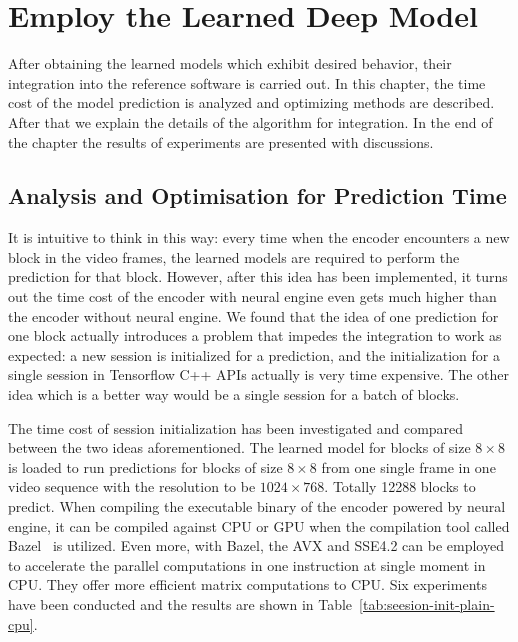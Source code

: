 \chapter{Employ the Learned Deep Model}\label{ch:chapter5} %
%
%
After obtaining the learned models which exhibit desired behavior, 
their integration into the reference software is carried out.
In this chapter, the time cost of the model prediction
is analyzed and optimizing methods are described.
After that we explain the details of the algorithm for integration.
In the end of the chapter the results of experiments 
are presented with discussions.

%
\section{Analysis and Optimisation for Prediction Time}\label{sec:analysis-and-optimization}
It is intuitive to think in this way: 
every time when the encoder encounters a new block in the video frames,
the learned models are required to perform the prediction for that block.
However, after this idea has been implemented, it turns out the
time cost of the encoder with neural engine even gets much higher 
than the encoder without neural engine.
We found that the idea of one prediction for one block actually
introduces a problem that impedes the integration to work as expected:
a new session is initialized for a prediction, and the initialization
for a single session in Tensorflow C++ APIs actually is very time
expensive.
The other idea which is a better way would be a single 
session for a batch of blocks.

The time cost of session initialization has been investigated
and compared between the two ideas aforementioned.
The learned model for blocks of size \(8\times8\) is loaded 
to run predictions for blocks of size \(8\times8\) from one single
frame in one video sequence with the resolution to 
be \(1024\times768\).
Totally 12288 blocks to predict.
When compiling the executable binary of the encoder
powered by neural engine, it can be compiled 
against CPU or GPU when the compilation tool 
called Bazel~\parencite{RN200} is utilized.
Even more, with Bazel, the AVX and SSE4.2 can be employed to
accelerate the parallel computations in one instruction
at single moment in CPU\@.
They offer more efficient matrix computations
to CPU\@.
Six experiments have been conducted and the results
are shown in 
Table~\ref{tab:seesion-init-plain-cpu}.


